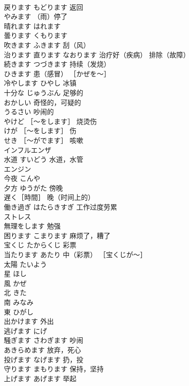 \documentclass[8pt]{extreport}
\begin{document}
\begin{CJK}{UTF8}{min}
\\	戻ります	もどります 返回	
\\	やみます	（雨）停了	
\\	晴れます	はれます	
\\	曇ります	くもります	
\\	吹きます	ふきます 刮（风）	
\\	治ります 直ります	なおります 治疗好（疾病） 排除（故障）	
\\	続きます	つづきます 持续（发烧）	
\\	ひきます	患（感冒） ［かぜを〜］	
\\	冷やします	ひやし 冰镇	
\\	十分な	じゅうぶん 足够的	
\\	おかしい	奇怪的，可疑的	
\\	うるさい	吵闹的	
\\	やけど	［〜をします］ 烧烫伤	
\\	けが	［〜をします］ 伤	
\\	せき	［〜がでます］ 咳嗽	
\\	インフルエンザ	
\\	水道	すいどう 水道，水管	
\\	エンジン	
\\	今夜	こんや	
\\	夕方	ゆうがた 傍晚	
\\	遅く［時間］	晚（时间上的）	
\\	働き過ぎ	はたらきすぎ 工作过度劳累	
\\	ストレス	
\\	無理をします	勉强	
\\	困ります	こまります 麻烦了，糟了	
\\	宝くじ	たからくじ 彩票	
\\	当たります	あたり 中（彩票） ［宝くじが〜］	
\\	太陽	たいよう	
\\	星	ほし	
\\	風	かぜ	
\\	北	きた	
\\	南	みなみ	
\\	東	ひがし	
\\	出かけます	外出	
\\	逃げます	にげ	
\\	騒ぎます	さわぎます 吵闹	
\\	あきらめます	放弃，死心	
\\	投げます	なげます 扔，投	
\\	守ります	まもります 保持，坚持	
\\	上げます	あげます 举起	

\end{CJK}
\end{document}
